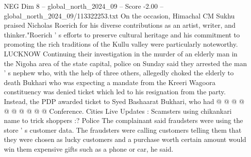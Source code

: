 \begin{textsample}{NEG Dim 8 – global\_north\_2024\_09 – Score -2.00 – global\_north\_2024\_09/113322253.txt}
On the occasion, Himachal CM Sukhu praised Nicholas Roerich for his diverse contributions as an artist, writer, and thinker."Roerich ' s efforts to preserve cultural heritage and his commitment to promoting the rich traditions of the Kullu valley were particularly noteworthy.
LUCKNOW Continuing their investigation in the murder of an elderly man in the Nigoha area of the state capital, police on Sunday said they arrested the man ' s nephew who, with the help of three others, allegedly choked the elderly to death Bukhari who was expecting a mandate from the Kreeri Wagoora constituency was denied ticket which led to his resignation from the party.
Instead, the PDP awarded ticket to Syed Bashaarat Bukhari, who had @ @ @ @ @ @ @ @ @ @ Conference.
Cities Live Updates : Scamsters using chikankari name to trick shoppers :?
Police The complainant said fraudsters were using the store ' s customer data.
The fraudsters were calling customers telling them that they were chosen as lucky customers and a purchase worth certain amount would win them expensive gifts such as a phone or car, he said.

\end{textsample}
